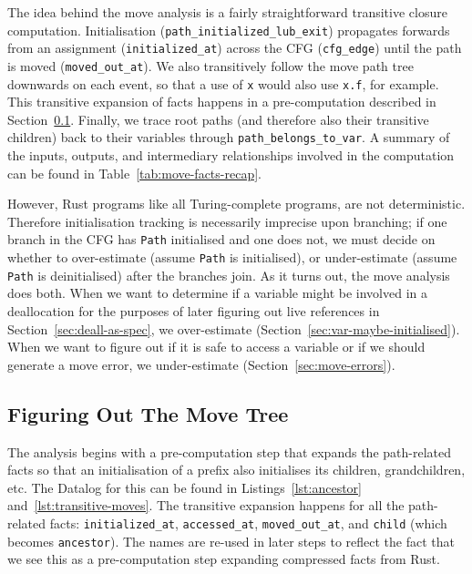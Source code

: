 \documentclass[11pt,a4paper,twoside,openany]{report}
\newcommand{\InRust}[1]{\texttt{#1}}
\newcommand{\InDatalog}[1]{\texttt{#1}}
\begin{document}
The idea behind the move analysis is a fairly straightforward transitive closure
computation. Initialisation (\InDatalog{path_initialized_lub_exit}) propagates
forwards from an assignment (\InDatalog{initialized_at}) across the CFG
(\InDatalog{cfg_edge}) until the path is moved (\InDatalog{moved_out_at}). We
also transitively follow the move path tree downwards on each event, so that a
use of \InRust{x} would also use \InRust{x.f}, for example. This transitive
expansion of facts happens in a pre-computation described in
Section~\ref{sec:move:fixpoints}. Finally, we trace root paths (and therefore
also their transitive children) back to their variables through
\InDatalog{path_belongs_to_var}. A summary of the inputs, outputs, and
intermediary relationships involved in the computation can be found in
Table~\ref{tab:move-facts-recap}.

However, Rust programs like all Turing-complete programs, are not deterministic.
Therefore initialisation tracking is necessarily imprecise upon branching; if
one branch in the CFG has \InDatalog{Path} initialised and one does not, we must
decide on whether to over-estimate (assume \InDatalog{Path} is initialised), or
under-estimate (assume \InDatalog{Path} is deinitialised) after the branches
join. As it turns out, the move analysis does both. When we want to determine if
a variable might be involved in a deallocation for the purposes of later
figuring out live references in Section~\ref{sec:deall-as-spec}, we
over-estimate (Section~\ref{sec:var-maybe-initialised}). When we want to figure
out if it is safe to access a variable or if we should generate a move error, we
under-estimate (Section~\ref{sec:move-errors}).

\subsection{Figuring Out The Move Tree}\label{sec:move:fixpoints}

The analysis begins with a pre-computation step that expands the path-related
facts so that an initialisation of a prefix also initialises its children,
grandchildren, etc. The Datalog for this can be found in
Listings~\ref{lst:ancestor} and~\ref{lst:transitive-moves}. The transitive
expansion happens for all the path-related facts: \InDatalog{initialized_at},
\InDatalog{accessed_at}, \InDatalog{moved_out_at}, and \InDatalog{child} (which
becomes \InDatalog{ancestor}). The names are re-used in later steps to reflect
the fact that we see this as a pre-computation step expanding compressed facts
from Rust.
\end{document}
